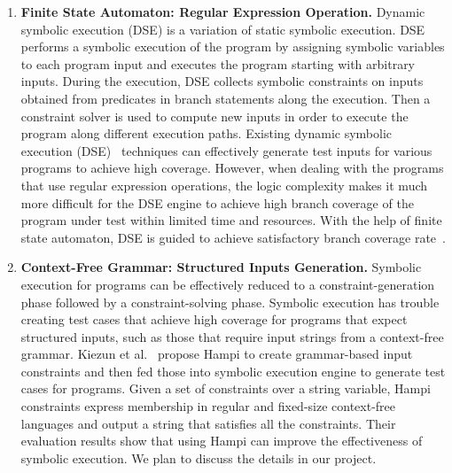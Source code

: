 \documentclass[times, 10pt,onecolumn]{article}
\begin{document}
\begin{enumerate}
\item{\textbf{Finite State Automaton: Regular Expression Operation.} Dynamic symbolic execution (DSE) is a variation of static symbolic execution. DSE performs a symbolic execution of the program by assigning symbolic variables to each program input and executes the program starting with arbitrary inputs. During the execution, DSE collects symbolic constraints on inputs obtained from predicates in branch statements along the execution. Then a constraint solver is used to compute new inputs in order to execute the program along different execution paths. Existing dynamic symbolic execution (DSE)~\cite{dart,exe,cute} techniques can effectively generate test inputs for various programs to achieve high coverage. However, when dealing with the programs that use regular expression operations, the logic complexity makes it much more difficult for the DSE engine to achieve high branch coverage of the program under test within limited time and resources. With the help of finite state automaton, DSE is guided to achieve satisfactory branch coverage rate~\cite{reggae}.}

\item{\textbf{Context-Free Grammar: Structured Inputs Generation.} Symbolic execution for programs can be effectively reduced to a constraint-generation phase followed by a constraint-solving phase. Symbolic execution has trouble creating test cases that achieve high coverage for programs that expect structured inputs, such as those that require input strings from a context-free grammar. Kiezun et al.~\cite{hampi} propose Hampi to create grammar-based input constraints and then fed those into symbolic execution engine to generate test cases for programs. Given a set of constraints over a string variable, Hampi constraints express membership in regular and fixed-size context-free languages and output a string that satisfies all the constraints. Their evaluation results show that using Hampi can improve the effectiveness of symbolic execution. We plan to discuss the details in our project.}


\end{enumerate}
\end{document}
